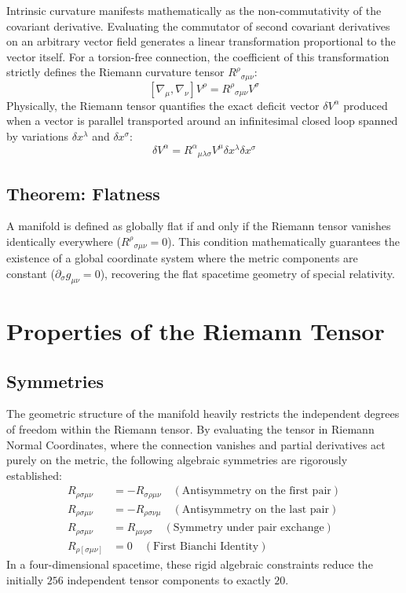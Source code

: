 \documentclass[11pt, a4paper]{report}
\begin{document}
Intrinsic curvature manifests mathematically as the non-commutativity of the covariant derivative. Evaluating the commutator of second covariant derivatives on an arbitrary vector field generates a linear transformation proportional to the vector itself. For a torsion-free connection, the coefficient of this transformation strictly defines the Riemann curvature tensor ${R^\rho}_{\sigma\mu\nu}$:
\begin{equation}\label{eq:riemann_def}
[\nabla_\mu, \nabla_\nu] V^\rho = {R^\rho}_{\sigma\mu\nu} V^\sigma
\end{equation}
Physically, the Riemann tensor quantifies the exact deficit vector $\delta V^{\alpha}$ produced when a vector is parallel transported around an infinitesimal closed loop spanned by variations $\delta x^\lambda$ and $\delta x^\sigma$:
\begin{equation}
\delta V^{\alpha} = {R^{\alpha}}_{\mu\lambda\sigma} V^{\mu} \delta x^{\lambda} \delta x^{\sigma}
\end{equation}

\subsection*{Theorem: Flatness}
A manifold is defined as globally flat if and only if the Riemann tensor vanishes identically everywhere ($R^\rho{}_{\sigma\mu\nu} = 0$). This condition mathematically guarantees the existence of a global coordinate system where the metric components are constant ($\partial_\sigma g_{\mu\nu} = 0$), recovering the flat spacetime geometry of special relativity.

\section{Properties of the Riemann Tensor}
\subsection*{Symmetries}
The geometric structure of the manifold heavily restricts the independent degrees of freedom within the Riemann tensor. By evaluating the tensor in Riemann Normal Coordinates, where the connection vanishes and partial derivatives act purely on the metric, the following algebraic symmetries are rigorously established:
\begin{align}
R_{\rho\sigma\mu\nu} &= -R_{\sigma\rho\mu\nu} \quad (\text{Antisymmetry on the first pair}) \\
R_{\rho\sigma\mu\nu} &= -R_{\rho\sigma\nu\mu} \quad (\text{Antisymmetry on the last pair}) \\
R_{\rho\sigma\mu\nu} &= R_{\mu\nu\rho\sigma} \quad (\text{Symmetry under pair exchange}) \\
R_{\rho[\sigma\mu\nu]} &= 0 \quad (\text{First Bianchi Identity})
\end{align}
In a four-dimensional spacetime, these rigid algebraic constraints reduce the initially $256$ independent tensor components to exactly $20$.
\end{document}
